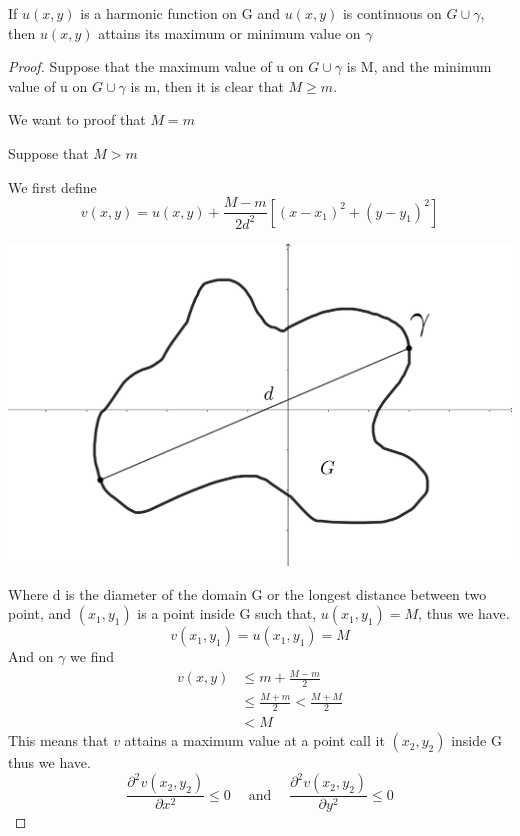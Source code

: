 \documentclass[]{article}
\begin{document}
\begin{theorem}
    If $u(x,y)$ is a harmonic function on G and $u(x,y)$ is continuous on $G \cup \gamma$, then $u(x,y)$ attains its maximum or minimum value on $\gamma$    
\end{theorem}
\begin{proof}
    Suppose that the maximum value of u on $G \cup \gamma$ is M, and the minimum value of u on $G \cup \gamma$ is m, then it is clear that $M \geq m$.
    \par
    We want to proof that $M = m$ 
    \par
    Suppose that $M > m$ 
    \par
    We first define
    \[
        v(x,y) = u(x,y) + \frac{M-m}{2d^2}\left[(x-x_{1})^2+(y-y_{1})^2\right]    
    \]
    \begin{center}
        \includegraphics[scale=0.1]{diameter.png}
    \end{center}
    Where d is the diameter of the domain G or the longest distance between two point, 
    and $(x_1,y_1)$ is a point inside G such that, $u(x_1,y_1) = M$, thus we have.
    \[
        v(x_1,y_1) = u(x_1,y_1) = M    
    \]
    And on $\gamma$ we find
    \begin{align*}
        v(x,y) &\leq m+\frac{M-m}{2}
        \\
        &\leq \frac{M+m}{2} < \frac{M+M}{2}
        \\
        &< M
    \end{align*}
    This means that $v$ attains a maximum value at a point call it $(x_2,y_2)$ inside G thus we have.
    \[
        \frac{\partial^2 v(x_2,y_2)}{\partial x^2} \leq 0 \quad\; \text{and} \quad\; \frac{\partial^2 v(x_2,y_2)}{\partial y^2} \leq 0    
\]
\end{proof}
\end{document}
